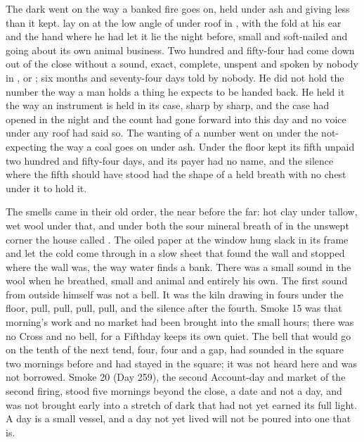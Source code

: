 
The dark went on the way a banked fire goes on, held under ash and giving less than it kept.  lay on  at the low angle of  under  roof in , with the fold at his ear and the hand where he had let it lie the night before, small and soft-nailed and going about its own animal business. Two hundred and fifty-four had come down out of the close without a sound, exact, complete, unspent and spoken by nobody in ,  or ; six months and seventy-four days told by nobody. He did not hold the number the way a man holds a thing he expects to be handed back. He held it the way an instrument is held in its case, sharp by sharp, and the case had opened in the night and the count had gone forward into this day and no voice under any roof had said so. The wanting of a number went on under the not-expecting the way a coal goes on under ash. Under the floor  kept its fifth unpaid two hundred and fifty-four days, and its payer had no name, and the silence where the fifth should have stood had the shape of a held breath with no chest under it to hold it.

The smells came in their old order, the near before the far: hot clay under tallow, wet wool under that, and under both the sour mineral breath of  in the unswept corner the house called . The oiled paper at the window hung slack in its frame and let the cold come through in a slow sheet that found the wall and stopped where the wall was, the way water finds a bank. There was a small sound in the wool when he breathed, small and animal and entirely his own. The first sound from outside himself was not a bell. It was the kiln drawing in fours under the floor, pull, pull, pull, pull, and the silence after the fourth. Smoke 15 was that morning's work and no market had been brought into the small hours; there was no Cross and no bell, for a Fifthday keeps its own quiet. The bell that would go on the tenth of the next tend, four, four and a gap, had sounded in the square two mornings before and had stayed in the square; it was not heard here and was not borrowed. Smoke 20 (Day 259), the second Account-day and market of the second firing, stood five mornings beyond the close, a date and not a day, and was not brought early into a stretch of dark that had not yet earned its full light. A day is a small vessel, and a day not yet lived will not be poured into one that is.

